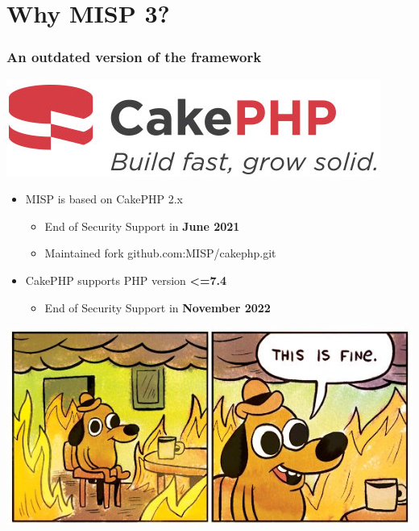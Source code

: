 \section{Why MISP 3?}
\begin{frame}
    \frametitle{An outdated version of the framework}
    \begin{center}
        \includegraphics[width=0.3\linewidth]{pictures/cakephp.png}
    \end{center}
    \begin{itemize}
        \item MISP is based on CakePHP 2.x
        \begin{itemize}
            \item End of Security Support in {\bf June 2021}
            \item Maintained fork github.com:MISP/cakephp.git
        \end{itemize}
        \item CakePHP supports PHP version {\bf <=7.4}
        \begin{itemize}
            \item End of Security Support in {\bf November 2022}
        \end{itemize}
    \end{itemize}
    \begin{center}
        \includegraphics[width=0.5\linewidth]{pictures/this-is-fine.jpg}
    \end{center}
\end{frame}

